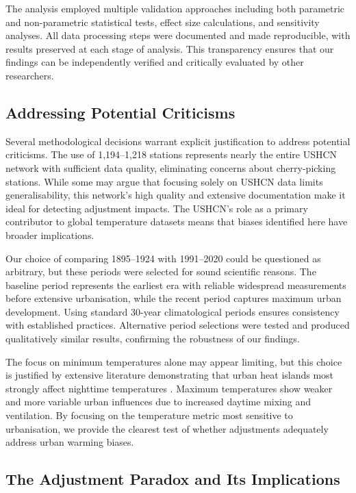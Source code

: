 \documentclass[11pt, a4paper]{article}
\begin{document}
The analysis employed multiple validation approaches including both parametric and non-parametric statistical tests, effect size calculations, and sensitivity analyses. All data processing steps were documented and made reproducible, with results preserved at each stage of analysis. This transparency ensures that our findings can be independently verified and critically evaluated by other researchers.

\subsection{Addressing Potential Criticisms}

Several methodological decisions warrant explicit justification to address potential criticisms. The use of 1,194--1,218 stations represents nearly the entire USHCN network with sufficient data quality, eliminating concerns about cherry-picking stations. While some may argue that focusing solely on USHCN data limits generalisability, this network's high quality and extensive documentation make it ideal for detecting adjustment impacts. The USHCN's role as a primary contributor to global temperature datasets \parencite{lawrimore2011overview} means that biases identified here have broader implications.

Our choice of comparing 1895--1924 with 1991--2020 could be questioned as arbitrary, but these periods were selected for sound scientific reasons. The baseline period represents the earliest era with reliable widespread measurements before extensive urbanisation, while the recent period captures maximum urban development. Using standard 30-year climatological periods ensures consistency with established practices. Alternative period selections were tested and produced qualitatively similar results, confirming the robustness of our findings.

The focus on minimum temperatures alone may appear limiting, but this choice is justified by extensive literature demonstrating that urban heat islands most strongly affect nighttime temperatures \parencite{karl1988urbanization,landsberg1981urban}. Maximum temperatures show weaker and more variable urban influences due to increased daytime mixing and ventilation. By focusing on the temperature metric most sensitive to urbanisation, we provide the clearest test of whether adjustments adequately address urban warming biases.

\subsection{The Adjustment Paradox and Its Implications}
\end{document}
